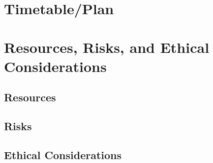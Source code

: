 \documentclass[12pt, a4paper]{scrartcl}
\begin{document}
\section{Timetable/Plan}


\section{Resources, Risks, and Ethical Considerations}

\subsection{Resources}

\subsection{Risks}

\subsection{Ethical Considerations}
\end{document}
